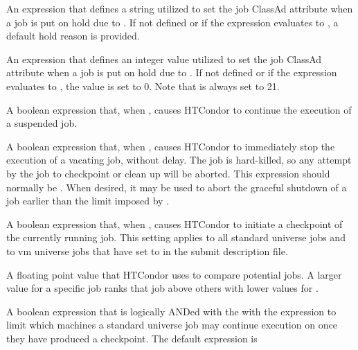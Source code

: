 \begin{description}
\label{param:WantHoldReason}
\item[\Macro{WANT\_HOLD\_REASON}]
  An expression that defines a string utilized to set the job ClassAd
  attribute  when a job is put on hold due to
  .
  If not defined or if the expression evaluates to ,
  a default hold reason is provided.

\label{param:WantHoldSubcode}
\item[\Macro{WANT\_HOLD\_SUBCODE}]
  An expression that defines an integer value utilized to set the job ClassAd
  attribute   when a job is put on hold due to
  .
  If not defined or if the expression evaluates to ,
  the value is set to 0.
  Note that  is always set to 21.

\label{param:Continue}
\item[\Macro{CONTINUE}]
  A boolean expression that, when ,
  causes HTCondor to continue the execution of a suspended job.

\label{param:Kill}
\item[\Macro{KILL}]
  A boolean expression that, when ,
  causes HTCondor to immediately stop the
  execution of a vacating job, without delay.
  The job is hard-killed, so any attempt by the job to checkpoint or
  clean up will be aborted.  This expression should normally be
  .  When desired, it may be used to abort the graceful
  shutdown of a job earlier than the limit imposed by
  .

\label{param:PeriodicCheckpoint}
\item[\Macro{PERIODIC\_CHECKPOINT}]
  A boolean expression that, when , causes HTCondor to
  initiate a checkpoint of the currently running job. This setting
  applies to all standard universe jobs and to vm universe jobs
  that have set  to 
  in the submit description file.

\label{param:Rank}
\item[\Macro{RANK}]
  A floating point value that HTCondor uses to compare potential jobs.
  A larger value for a specific job ranks that job above
  others with lower values for .

\label{param:IsValidCheckpointPlatform}
\item[\Macro{IS\_VALID\_CHECKPOINT\_PLATFORM}]
  A boolean expression that is logically ANDed with the
  with the  expression to limit which machines a
  standard universe job may continue execution on once they have
  produced a checkpoint.
  The default expression is


\end{description}
